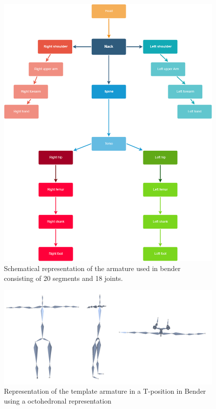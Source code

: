\begin{figure} [!htb]
    \centering
	\includegraphics[width=14cm]{content/images/Armature}
	\caption{Schematical representation of the armature used in bender consisting of 20 segments and 18 joints.} 
	\label{fig:Armature}
\end{figure}

\begin{figure} [!htb]
    \centering
	\includegraphics[width=15cm]{content/images/arm}
	\caption{Representation of the template armature in a T-position in Bender using a octohedronal representation} 
	\label{fig:arm}
\end{figure}

